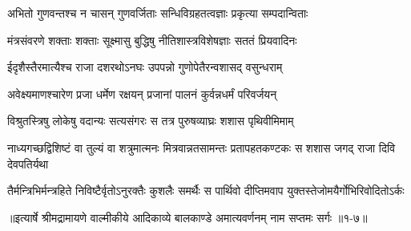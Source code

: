 \twolineshloka
{अभितो गुणवन्तश्च न चासन् गुणवर्जिताः}
{सन्धिविग्रहतत्वज्ञाः प्रकृत्या सम्पदान्विताः} %

\twolineshloka
{मंत्रसंवरणे शक्ताः शक्ताः सूक्ष्मासु बुद्धिषु}
{नीतिशास्त्रविशेषज्ञाः सततं प्रियवादिनः} %

\twolineshloka
{ईदृशैस्तैरमात्यैश्च राजा दशरथोऽनघः}
{उपपन्नो गुणोपेतैरन्वशासद् वसुन्धराम्} %

\twolineshloka
{अवेक्ष्यमाणश्चारेण प्रजा धर्मेण रक्षयन्}
{प्रजानां पालनं कुर्वन्नधर्मं परिवर्जयन्} %

\twolineshloka
{विश्रुतस्त्रिषु लोकेषु वदान्यः सत्यसंगरः}
{स तत्र पुरुषव्याघ्रः शशास पृथिवीमिमाम्} %

\threelineshloka
{नाध्यगच्छद्विशिष्टं वा तुल्यं वा शत्रुमात्मनः}
{मित्रवान्नतसामन्तः प्रतापहतकण्टकः}
{स शशास जगद् राजा दिवि देवपतिर्यथा} %

\twolineshloka
{तैर्मन्त्रिभिर्मन्त्रहिते निविष्टैर्वृतोऽनुरक्तैः कुशलैः समर्थैः}
{स पार्थिवो दीप्तिमवाप युक्तस्तेजोमयैर्गोभिरिवोदितोऽर्कः} %


॥इत्यार्षे श्रीमद्रामायणे वाल्मीकीये आदिकाव्ये बालकाण्डे अमात्यवर्णनम् नाम सप्तमः सर्गः ॥१-७॥
